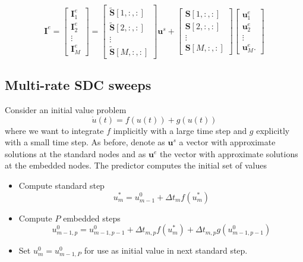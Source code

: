 \documentclass{article}
\newcommand{\ve}[1]{\mathbf{#1}}
\begin{document}
\begin{equation}
	\ve{I}^e = 
	\begin{bmatrix}
		\ve{I}^e_1 \\ \ve{I}^e_2 \\ \vdots \\ \ve{I}^e_M
	\end{bmatrix} = 
	\begin{bmatrix}
		\tilde{\ve{S}}[1,:,:] \\ \tilde{\ve{S}}[2,:,:]  \\ \vdots \\ \tilde{\ve{S}}[M,:,:] 
	\end{bmatrix}
	\ve{u}^s
	+
	\begin{bmatrix}
		\ve{S}[1,:,:] \\ \ve{S}[2,:,:] \\ \vdots \\ \ve{S}[M,:,:] 
	\end{bmatrix}
	\begin{bmatrix}
		\ve{u}^e_1 \\ \ve{u}^e_2 \\ \vdots \\ \ve{u}^e_M.
	\end{bmatrix}
\end{equation}
%
%
%
\subsection*{Multi-rate SDC sweeps}
Consider an initial value problem
\begin{equation}
	\dot{u}(t) = f(u(t)) + g(u(t))
\end{equation}
where we want to integrate $f$ implicitly with a large time step and $g$ explicitly with a small time step.
As before, denote as $\ve{u}^s$ a vector with approximate solutions at the standard nodes and as $\ve{u}^{e}$ the vector with approximate solutions at the embedded nodes.
The predictor computes the initial set of values
\begin{itemize}
	\item Compute standard step
	\begin{equation*}
		u^*_{m} = u^0_{m-1} + \Delta t_m f(u^*_{m})
	\end{equation*}
	\item Compute $P$ embedded steps
	\begin{equation*}
		u^0_{m-1,p} = u^0_{m-1,p-1} + \Delta t_{m,p} f(u^*_{m}) + \Delta t_{m,p} g(u^0_{m-1,p-1})
	\end{equation*}
	\item Set $u^0_{m} = u^0_{m-1,P}$ for use as initial value in next standard step.
\end{itemize}
\end{document}
